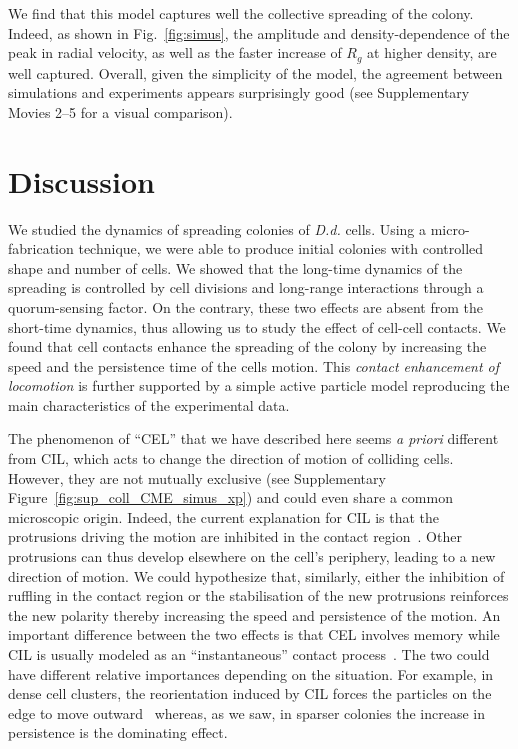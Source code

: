 \documentclass[11pt, twocolumn]{article}
\newcommand\rev[1]{{#1}}
\begin{document}
We find that this model captures well the collective spreading of the
colony. Indeed, as shown in Fig.~\ref{fig:simus}, the amplitude and
density-dependence of the peak in radial velocity, as well as the
faster increase of $R_g$ at higher density, are well
captured. Overall, given the simplicity of the model, the
agreement between simulations and experiments appears surprisingly
good (see Supplementary Movies 2--5 for a visual comparison).

\section*{Discussion}
We studied the dynamics of spreading colonies of \textit{D.d.}
cells. Using a micro-fabrication technique, we were able to produce
initial colonies with controlled shape and number of cells.  We showed
that the long-time dynamics of the spreading is controlled by cell
divisions and long-range interactions through a quorum-sensing
factor. On the contrary, these two effects are absent from the
short-time dynamics, thus allowing us to study the effect of cell-cell
contacts. We found that cell contacts enhance the spreading of the
colony by increasing the speed and the persistence time of the cells motion. This {\it contact
  enhancement of locomotion} is further supported by a simple active
particle model reproducing the main characteristics of the
experimental data.

The phenomenon of ``CEL'' that we have described here seems \textit{a
  priori} different from CIL, which acts to change the direction of
motion of colliding cells. However, \rev{ they are not mutually
  exclusive (see Supplementary Figure~\ref{fig:sup_coll_CME_simus_xp}) and could even share a common microscopic origin.}%
Indeed, the current explanation for CIL is that the protrusions
driving the motion are inhibited in the contact
region~\cite{Mayor2010,Stramer2016}. Other protrusions can thus
develop elsewhere on the cell's periphery, leading to a new direction
of motion. We could hypothesize that, similarly, \rev{either the
  inhibition of ruffling in the contact region or the stabilisation of
  the new protrusions reinforces the new polarity thereby increasing
  the speed and persistence of the motion. An important difference between the two
  effects is that CEL involves memory while CIL is usually modeled as
  an ``instantaneous'' contact
  process~\cite{Davis2012,Zimmermann2016,Camley2016,Szabo2016}.}
The two could have different relative importances depending on the
situation. For example, in dense cell clusters, the reorientation
induced by CIL forces the particles on the edge to move
outward~\cite{Carmona2008,Zimmermann2016} whereas, as we saw, in
sparser colonies the increase in persistence is the dominating effect.
\end{document}
